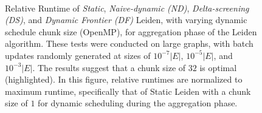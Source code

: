 \begin{figure}[!htp]
{  } \\[-1ex]
  \caption{Relative Runtime of \textit{Static}, \textit{Naive-dynamic (ND)}, \textit{Delta-screening (DS)}, and \textit{Dynamic Frontier (DF)} Leiden, with varying dynamic schedule chunk size (OpenMP), for aggregation phase of the Leiden algorithm. These tests were conducted on large graphs, with batch updates randomly generated at sizes of $10^{-7}|E|$, $10^{-5}|E|$, and $10^{-3}|E|$. The results suggest that a chunk size of $32$ is optimal (highlighted). In this figure, relative runtimes are normalized to maximum runtime, specifically that of Static Leiden with a chunk size of $1$ for dynamic scheduling during the aggregation phase.}
  \label{fig:aggregation-adjust-chunksize}
\end{figure}

